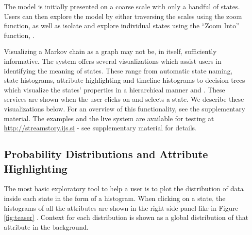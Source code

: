 The model is initially presented on a coarse scale with only a handful
of states. Users can then explore the model by either traversing the scales using the zoom 
function, as well as isolate and explore individual states using the ``Zoom Into'' function, .

Visualizing a Markov chain as a graph may not be, in itself,  sufficiently informative. The system offers several 
visualizations which assist users in identifying the meaning of states. These range from automatic
state naming, state histograms, attribute highlighting and timeline histograms to decision trees
which visualize the states' properties in a hierarchical manner and .
These services are shown when the user clicks on and selects a state. We describe these visualizations below.  For an overview of this functionality, see the supplementary material. The examples and the live system are available for testing at \url{http://streamstory.ijs.si} - see supplementary material for details. 




\subsection{Probability Distributions and Attribute Highlighting}

The most basic exploratory tool to help a user is to plot the distribution of data inside each state in the form of a histogram. When clicking on a state, the histograms of all the attributes are shown in the right-side panel like in Figure \ref{fig:teaser} . Context for each distribution is shown as a global distribution of that attribute in the background.

